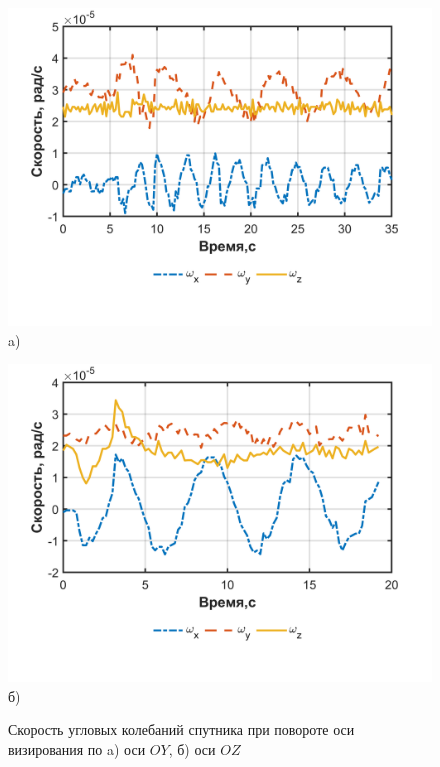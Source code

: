  \begin{figure}[h!]
	\begin{minipage}[b][][b]{0.49\linewidth}\centering
		\includegraphics[width=1\linewidth]{matlab/img/sat_gyro_dataY.png} \\ a)
	\end{minipage}
	\hfill
	\begin{minipage}[b][][b]{0.49\linewidth}\centering
		\includegraphics[width=1\linewidth]{matlab/img/sat_gyro_dataZ.png} \\ б)
	\end{minipage}
	\caption{Скорость угловых колебаний спутника при повороте оси визирования по a) оси $OY$, б) оси $OZ$ }
	\label{fig:rotationYZ}
\end{figure}

